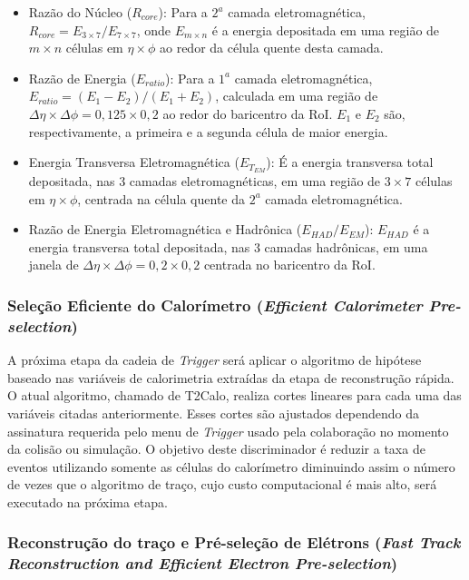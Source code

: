 \begin{itemize}

\item Razão do Núcleo ($R_{core}$): Para a $2^{a}$ camada eletromagnética, $R_{core} = E_{3\times7}/E_{7\times7}$, onde $E_{m\times n}$ é a energia depositada em uma
região de $m\times n$ células em $\eta\times\phi$ ao redor da célula quente desta camada.

\item Razão de Energia ($E_{ratio}$): Para a $1^{a}$ camada eletromagnética, $E_{ratio} = (E_{1}-E_{2})/(E_{1}+E_{2})$, calculada em uma região de 
$\Delta\eta\times\Delta\phi = 0,125\times0,2$ ao redor do baricentro da RoI. $E_{1}$ e $E_{2}$ são, respectivamente, a primeira e a segunda célula
de maior energia.

\item Energia Transversa Eletromagnética ($E_{T_{EM}}$): É a energia transversa total depositada, nas 3 camadas eletromagnéticas, em uma região de 
$3\times7$ células em $\eta\times\phi$, centrada na célula quente da $2^{a}$ camada eletromagnética.
 
\item Razão de Energia Eletromagnética e Hadrônica ($E_{HAD}/E_{EM}$): $E_{HAD}$ é a energia transversa total depositada, nas 3 camadas hadrônicas, em 
uma janela de $\Delta\eta\times\Delta\phi=0, 2\times0, 2$ centrada no baricentro da RoI. 

\end{itemize}

\subsubsection{Seleção Eficiente do Calorímetro (\textit{Efficient Calorimeter Pre-selection})}

A próxima etapa da cadeia de \textit{Trigger} será aplicar o algoritmo de hipótese baseado nas variáveis de calorimetria extraídas da etapa de reconstrução rápida. O atual
algoritmo, chamado de T2Calo, realiza cortes lineares para cada uma das variáveis citadas anteriormente. Esses cortes são ajustados dependendo da assinatura requerida
pelo menu de \textit{Trigger} usado pela colaboração no momento da colisão ou simulação. O objetivo deste discriminador é reduzir a taxa de eventos utilizando somente
as células do calorímetro diminuindo assim o número de vezes que o algoritmo de traço, cujo custo computacional é mais alto, será executado na próxima etapa. 

\subsubsection{Reconstrução do traço e Pré-seleção de Elétrons (\textit{Fast Track Reconstruction and Efficient Electron Pre-selection})}

